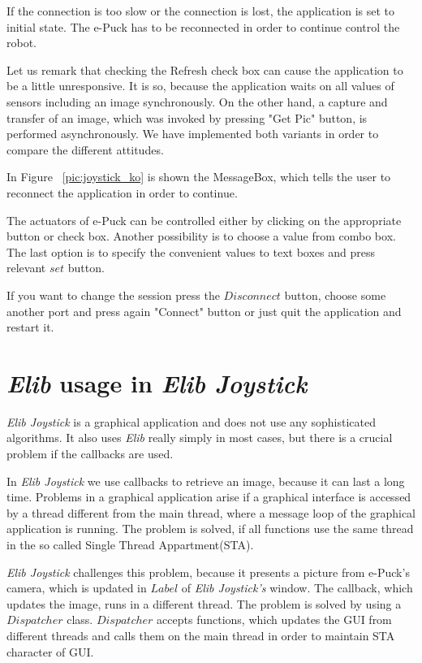 \documentclass[12pt,notitlepage]{report}
\begin{document}
	If the connection is too slow or the connection is lost, the application
	is set to initial state. The e-Puck has to be reconnected in order to continue control the robot.

	Let us remark that checking the Refresh check box can cause the application to be a little unresponsive.	
	It is so, because the application waits on all values of sensors including an image synchronously.
	On the other hand, a capture and transfer of an image, which was invoked by pressing "Get Pic" button,
	is performed asynchronously. 
	We have implemented both variants in order to compare the different attitudes.

	
	In Figure ~\ref{pic:joystick_ko} is shown the MessageBox, which tells the user to reconnect the application
	in order to continue.

	The actuators of e-Puck can be controlled either by clicking on the appropriate button or check box. 
	Another	possibility is to choose a value from combo box.
	The last option is to specify the  convenient values to text boxes and press relevant $set$ button.

	If you want to change the session press the $Disconnect$ button, choose some another port and 
	press again "Connect" button or	just quit the application and restart it.

	\section{{\it Elib} usage in {\it Elib Joystick}}\label{sec:joystick_trick}
	{\it Elib Joystick} is a graphical application and does not use any sophisticated algorithms. 
	It also uses {\it Elib} really simply in most cases, but there is a crucial problem if the callbacks are used.

	In {\it Elib Joystick} we use callbacks to retrieve an image, because it can last a long time.
	Problems in a graphical application arise if a graphical interface is accessed by a thread different from
	the main thread, where a message loop of the graphical application is running. The problem is solved,
	if all functions use the same thread in the so called Single Thread Appartment(STA).

	{\it Elib Joystick} challenges this problem, because it presents a picture from e-Puck's camera, which is updated
	in $Label$ of {\it Elib Joystick's} window. The callback, which updates the image, runs in a different thread.
	The problem is solved by using a $Dispatcher$ class. $Dispatcher$ accepts functions, which updates
	the GUI from different threads and calls them on the main thread in order to maintain STA character
	of GUI. 
\end{document}
